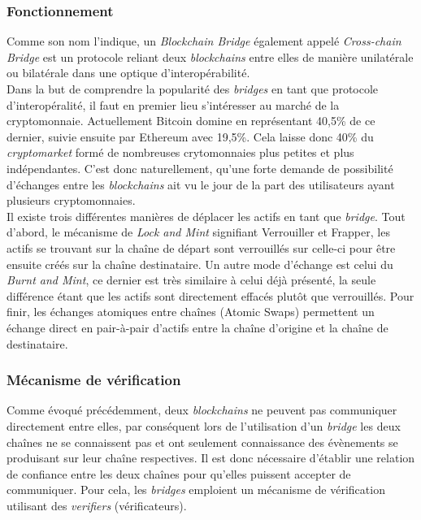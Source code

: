 
\subsubsection{Fonctionnement}

Comme son nom l’indique, un \textit{Blockchain Bridge} également appelé \textit{Cross-chain Bridge} est un protocole reliant deux \textit{blockchains} entre elles de manière unilatérale ou bilatérale dans une optique d’interopérabilité.\\

Dans la but de comprendre la popularité des \textit{bridges} en tant que protocole d’interopéralité, il faut en premier lieu s’intéresser au marché de la cryptomonnaie. Actuellement Bitcoin domine en représentant 40,5\% de ce dernier, suivie ensuite par Ethereum avec 19,5\%. Cela laisse donc 40\% du \textit{cryptomarket} formé de nombreuses crytomonnaies plus petites et plus indépendantes. C’est donc naturellement, qu’une forte demande de possibilité d’échanges entre les \textit{blockchains} ait vu le jour de la part des utilisateurs ayant plusieurs cryptomonnaies\cite{NgraveNumbers}.\\

Il existe trois différentes manières de déplacer les actifs en tant que \textit{bridge}. Tout d’abord, le mécanisme de \textit{Lock and Mint} signifiant Verrouiller et Frapper, les actifs se trouvant sur la chaîne de départ sont verrouillés sur celle-ci pour être ensuite créés sur la chaîne destinataire. Un autre mode d'échange est celui du \textit{Burnt and Mint}, ce dernier est très similaire à celui déjà présenté, la seule différence étant que les actifs sont directement effacés plutôt que verrouillés. Pour finir, les échanges atomiques entre chaînes (Atomic Swaps) permettent un échange direct en pair-à-pair d'actifs entre la chaîne d’origine et la chaîne de destinataire.\cite{EthereumMechanism}

\subsubsection{Mécanisme de vérification}

Comme évoqué précédemment, deux \textit{blockchains} ne peuvent pas communiquer directement entre elles, par conséquent lors de l’utilisation d’un \textit{bridge} les deux chaînes ne se connaissent pas et ont seulement connaissance des évènements se produisant sur leur chaîne respectives. Il est donc nécessaire d’établir une relation de confiance entre les deux chaînes pour qu’elles puissent accepter de communiquer. Pour cela, les \textit{bridges} emploient un mécanisme de vérification utilisant des \textit{verifiers} (vérificateurs). \\


